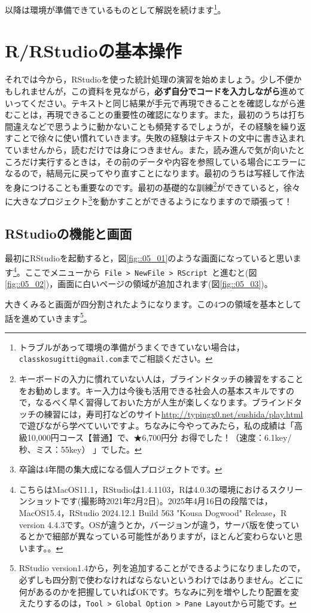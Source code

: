 \documentclass{ltjsbook}
\begin{document}
以降は環境が準備できているものとして解説を続けます\footnote{トラブルがあって環境の準備がうまくできていない場合は，\texttt{classkosugitti@gmail.com}までご相談ください。}。

\section{R/RStudioの基本操作}
それでは今から，RStudioを使った統計処理の演習を始めましょう。少し不便かもしれませんが，この資料を見ながら，\textbf{必ず自分でコードを入力しながら}進めていってください。テキストと同じ結果が手元で再現できることを確認しながら進むことは，再現できることの重要性の確認になります。また，最初のうちは打ち間違えなどで思うように動かないことも頻発するでしょうが，その経験を繰り返すことで徐々に使い慣れていきます。失敗の経験はテキストの文中に書き込まれていませんから，読むだけでは身につきません。また，読み進んで気が向いたところだけ実行するときは，その前のデータや内容を参照している場合にエラーになるので，結局元に戻ってやり直すことになります。最初のうちは写経して作法を身につけることも重要なのです。最初の基礎的な訓練\footnote{キーボードの入力に慣れていない人は，ブラインドタッチの練習をすることをお勧めします。キー入力は今後も活用できる社会人の基本スキルですので，なるべく早く習得しておいた方が人生が楽しくなります。ブラインドタッチの練習には，寿司打などのサイト\url{http://typingx0.net/sushida/play.html}で遊びながら学べていいですよ。ちなみに今やってみたら，私の成績は「高級10,000円コース【普通】で、★6,700円分 お得でした！（速度：6.1key/秒、ミス：55key） 」でした。}ができていると，徐々に大きなプロジェクト\footnote{卒論は4年間の集大成になる個人プロジェクトです。}を動かすことができるようになりますので頑張って！

\subsection{RStudioの機能と画面}
最初にRStudioを起動すると，図\ref{fig::05_01}のような画面になっていると思います\footnote{こちらはMacOS11.1，RStudioは1.4.1103，Rは4.0.3の環境におけるスクリーンショットです(撮影時2021年2月2日)。2025年4月16日の段階では，MacOS15.4，RStudio 2024.12.1 Build 563 "Kousa Dogwood" Release，R version 4.4.3です。OSが違うとか，バージョンが違う，サーバ版を使っているとかで細部が異なっている可能性がありますが，ほとんど変わらないと思います。。}。ここでメニューから\verb| File > NewFile > RScript |と進むと(図\ref{fig::05_02})，画面に白いページの領域が追加されます(図\ref{fig::05_03})。

大きくみると画面が四分割されたようになります。この4つの領域を基本として話を進めていきます\footnote{RStudio version1.4から，列を追加することができるようになりましたので，必ずしも四分割で使わなければならないというわけではありません。どこに何があるのかを把握していればOKです。ちなみに列を増やしたり配置を変えたりするのは，\verb|Tool > Global Option > Pane Layout|から可能です。}。
\end{document}
